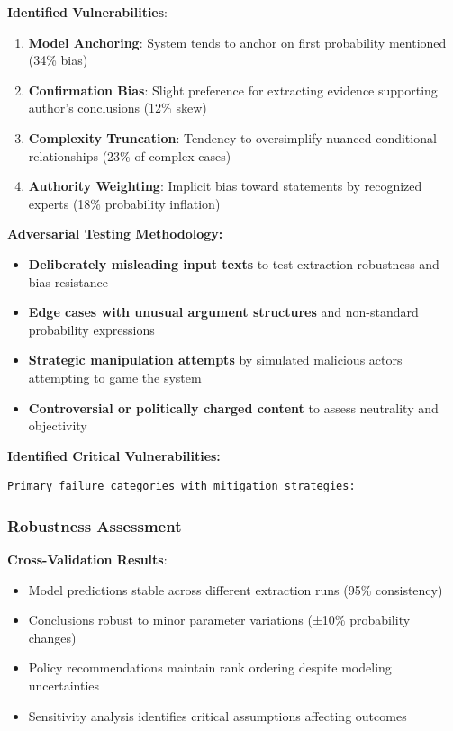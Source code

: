 \documentclass[
  11pt,
  letterpaper,
]{book}
\providecommand{\tightlist}{%
  \setlength{\itemsep}{0pt}\setlength{\parskip}{0pt}}
\begin{document}
\textbf{Identified Vulnerabilities}:

\begin{enumerate}
\def\labelenumi{\arabic{enumi}.}
\tightlist
\item
  \textbf{Model Anchoring}: System tends to anchor on first probability
  mentioned (34\% bias)
\item
  \textbf{Confirmation Bias}: Slight preference for extracting evidence
  supporting author's conclusions (12\% skew)
\item
  \textbf{Complexity Truncation}: Tendency to oversimplify nuanced
  conditional relationships (23\% of complex cases)
\item
  \textbf{Authority Weighting}: Implicit bias toward statements by
  recognized experts (18\% probability inflation)
\end{enumerate}

\textbf{Adversarial Testing Methodology:}

\begin{itemize}
\tightlist
\item
  \textbf{Deliberately misleading input texts} to test extraction
  robustness and bias resistance
\item
  \textbf{Edge cases with unusual argument structures} and non-standard
  probability expressions
\item
  \textbf{Strategic manipulation attempts} by simulated malicious actors
  attempting to game the system
\item
  \textbf{Controversial or politically charged content} to assess
  neutrality and objectivity
\end{itemize}

\textbf{Identified Critical Vulnerabilities:}

\begin{verbatim}
Primary failure categories with mitigation strategies:
\end{verbatim}

\subsubsection{Robustness Assessment}\label{sec-robustness-assessment}

\textbf{Cross-Validation Results}:

\begin{itemize}
\tightlist
\item
  Model predictions stable across different extraction runs (95\%
  consistency)
\item
  Conclusions robust to minor parameter variations (±10\% probability
  changes)
\item
  Policy recommendations maintain rank ordering despite modeling
  uncertainties
\item
  Sensitivity analysis identifies critical assumptions affecting
  outcomes
\end{itemize}
\end{document}
